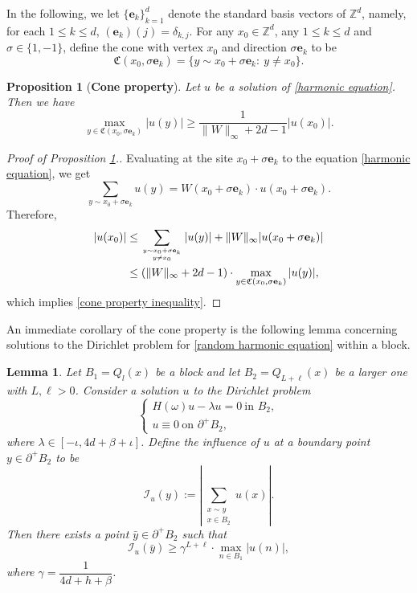 \documentclass[11pt,reqno,UTF8,twoside]{amsart}
\newcommand{\bfe}{\mathbf{e}}
\newtheorem{lem}[thm]{Lemma}
\newtheorem{prop}[thm]{Proposition}
\theoremstyle{definition}
\numberwithin{equation}{section}
\begin{document}
In the following, we  let $\{\mathbf{e}_k\}_{k=1}^d$ denote the standard basis vectors of $\mathbb{Z}^d$, namely, for each $1\leq k\leq d$, $ ({\bm e}_k)(j)=\delta_{k,j}$.  For any $x_0 \in \mathbb{Z}^d$, any $1 \leq k \leq d$  and $\sigma \in \{1,-1\}$, define the cone with vertex $x_0$ and direction $\sigma \mathbf{e}_k$  to be   \[\mathfrak{C}(x_0,\sigma \bfe_k)=\{y\sim x_0+\sigma \bfe_k:\ y\neq x_0\}.\]
\begin{prop}[{\bf Cone property}]\label{cone property}
Let $u$ be a solution of \eqref{harmonic equation}. 
  Then we have 
  \begin{equation}\label{cone property inequality}
    \max_{y\in \mathfrak{C}(x_0,\sigma \bfe_k) } |u(y)|\geq \frac{1}{\|W\|_{\infty}+2d-1} |u(x_0)|.
  \end{equation}
\end{prop}
\begin{proof}[Proof of Proposition \ref{cone property}.]
Evaluating  at the site $x_0 + \sigma \mathbf{e}_k$ to the equation \eqref{harmonic equation}, we get 
  \[\sum_{ y\sim x_0+\sigma \bfe_k} u(y)=W(x_0+\sigma \bfe_k) \cdot u(x_0+\sigma \bfe_k).\]
  Therefore,
  \begin{align*}
    |u(x_0)| & \leq \sum_{y\sim x_0+\sigma \bfe_k \atop y\neq x_0}|u(y)|+\| W\|_{\infty} |u(x_0+\sigma \bfe_k)| \\
      &\leq \left(\|W\|_{\infty}+2d-1\right)\cdot \max_{y\in \mathfrak{C}(x_0,\sigma \bfe_k) } |u(y)|,
  \end{align*}
which implies \eqref{cone property inequality}.
\end{proof}

An immediate corollary of the cone property is the following lemma concerning solutions to the Dirichlet problem for \eqref{random harmonic equation} within a block. 

\begin{lem}\label{transversality lemma}
Let $B_1=Q_l(x)$ be a block  and let $B_2=Q_{L+\ell}(x)$ be a larger one   with   $L, \ell>0$. Consider a solution $u$ to the Dirichlet problem
    \begin{equation*}
        \begin{cases}
            H(\omega)u - \lambda u = 0 \ \text{in } B_2, \\
            u \equiv 0 \ \text{on } \partial^{+} B_2,
        \end{cases}  
    \end{equation*}
    where $\lambda \in [-\iota, 4d+\beta+\iota]$. Define the influence of $u$ at a boundary point $y \in \partial^+ B_2$ to be 
    \begin{equation}
        \mathcal{I}_u(y) := \left| \sum_{\substack{x \sim y \\ x \in B_2}} u(x) \right|.
    \end{equation}
    Then there exists a point $\bar{y} \in \partial^+ B_2$ such that
    \[
    \mathcal{I}_{u}(\bar{y}) \geq \gamma ^{L + \ell} \cdot \max_{n\in B_1} |u(n)|,
    \]
    where $\gamma = \dfrac{1}{4d + h+\beta }$.
\end{lem}
\end{document}
